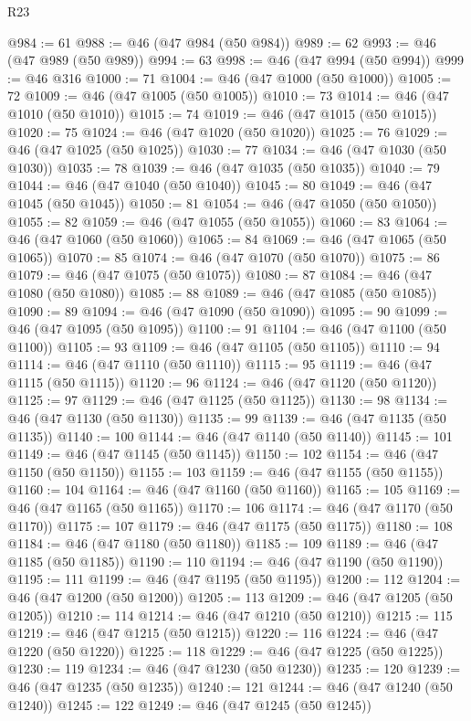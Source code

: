 \begin{lexlean}{R23}
\begin{coremodule}
@984 := 61
@988 := @46 (@47 @984 (@50 @984))
@989 := 62
@993 := @46 (@47 @989 (@50 @989))
@994 := 63
@998 := @46 (@47 @994 (@50 @994))
@999 := @46 @316
@1000 := 71
@1004 := @46 (@47 @1000 (@50 @1000))
@1005 := 72
@1009 := @46 (@47 @1005 (@50 @1005))
@1010 := 73
@1014 := @46 (@47 @1010 (@50 @1010))
@1015 := 74
@1019 := @46 (@47 @1015 (@50 @1015))
@1020 := 75
@1024 := @46 (@47 @1020 (@50 @1020))
@1025 := 76
@1029 := @46 (@47 @1025 (@50 @1025))
@1030 := 77
@1034 := @46 (@47 @1030 (@50 @1030))
@1035 := 78
@1039 := @46 (@47 @1035 (@50 @1035))
@1040 := 79
@1044 := @46 (@47 @1040 (@50 @1040))
@1045 := 80
@1049 := @46 (@47 @1045 (@50 @1045))
@1050 := 81
@1054 := @46 (@47 @1050 (@50 @1050))
@1055 := 82
@1059 := @46 (@47 @1055 (@50 @1055))
@1060 := 83
@1064 := @46 (@47 @1060 (@50 @1060))
@1065 := 84
@1069 := @46 (@47 @1065 (@50 @1065))
@1070 := 85
@1074 := @46 (@47 @1070 (@50 @1070))
@1075 := 86
@1079 := @46 (@47 @1075 (@50 @1075))
@1080 := 87
@1084 := @46 (@47 @1080 (@50 @1080))
@1085 := 88
@1089 := @46 (@47 @1085 (@50 @1085))
@1090 := 89
@1094 := @46 (@47 @1090 (@50 @1090))
@1095 := 90
@1099 := @46 (@47 @1095 (@50 @1095))
@1100 := 91
@1104 := @46 (@47 @1100 (@50 @1100))
@1105 := 93
@1109 := @46 (@47 @1105 (@50 @1105))
@1110 := 94
@1114 := @46 (@47 @1110 (@50 @1110))
@1115 := 95
@1119 := @46 (@47 @1115 (@50 @1115))
@1120 := 96
@1124 := @46 (@47 @1120 (@50 @1120))
@1125 := 97
@1129 := @46 (@47 @1125 (@50 @1125))
@1130 := 98
@1134 := @46 (@47 @1130 (@50 @1130))
@1135 := 99
@1139 := @46 (@47 @1135 (@50 @1135))
@1140 := 100
@1144 := @46 (@47 @1140 (@50 @1140))
@1145 := 101
@1149 := @46 (@47 @1145 (@50 @1145))
@1150 := 102
@1154 := @46 (@47 @1150 (@50 @1150))
@1155 := 103
@1159 := @46 (@47 @1155 (@50 @1155))
@1160 := 104
@1164 := @46 (@47 @1160 (@50 @1160))
@1165 := 105
@1169 := @46 (@47 @1165 (@50 @1165))
@1170 := 106
@1174 := @46 (@47 @1170 (@50 @1170))
@1175 := 107
@1179 := @46 (@47 @1175 (@50 @1175))
@1180 := 108
@1184 := @46 (@47 @1180 (@50 @1180))
@1185 := 109
@1189 := @46 (@47 @1185 (@50 @1185))
@1190 := 110
@1194 := @46 (@47 @1190 (@50 @1190))
@1195 := 111
@1199 := @46 (@47 @1195 (@50 @1195))
@1200 := 112
@1204 := @46 (@47 @1200 (@50 @1200))
@1205 := 113
@1209 := @46 (@47 @1205 (@50 @1205))
@1210 := 114
@1214 := @46 (@47 @1210 (@50 @1210))
@1215 := 115
@1219 := @46 (@47 @1215 (@50 @1215))
@1220 := 116
@1224 := @46 (@47 @1220 (@50 @1220))
@1225 := 118
@1229 := @46 (@47 @1225 (@50 @1225))
@1230 := 119
@1234 := @46 (@47 @1230 (@50 @1230))
@1235 := 120
@1239 := @46 (@47 @1235 (@50 @1235))
@1240 := 121
@1244 := @46 (@47 @1240 (@50 @1240))
@1245 := 122
@1249 := @46 (@47 @1245 (@50 @1245))

\end{coremodule}
\end{lexlean}
